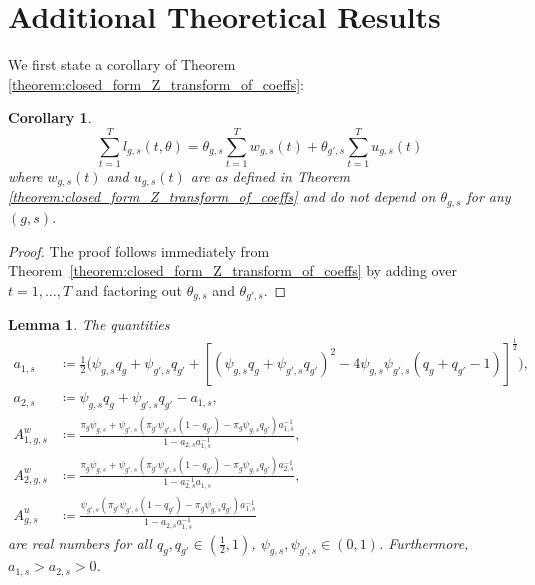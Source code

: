 \documentclass[letterpaper]{article} %
\newtheorem{lemma}{Lemma}
\newtheorem{corollary}{Corollary}
\begin{document}

\section{Additional Theoretical Results}\label{appendix:additional_theoretical_results}

We first state a corollary of Theorem \ref{theorem:closed_form_Z_transform_of_coeffs}:
%
\begin{corollary} \label{cor:total_mass_linear}
\begin{equation*}
    \sum_{t=1}^T l_{g,s}(t,\theta) = \theta_{g,s}\sum_{t=1}^T w_{g,s}(t) + \theta_{g',s}\sum_{t=1}^T u_{g,s}(t)
\end{equation*}
where $w_{g,s}(t)$ and $u_{g,s}(t)$ are as defined in Theorem \ref{theorem:closed_form_Z_transform_of_coeffs}  and do not depend on $\theta_{g,s}$ for any $(g,s)$.
\end{corollary}

\begin{proof}
    The proof follows immediately from Theorem~\ref{theorem:closed_form_Z_transform_of_coeffs} by adding over $t = 1,\dots,T$ and factoring out $\theta_{g,s}$ and $\theta_{g',s}$.
\end{proof}

\begin{lemma} \label{lemma:as_real}
The quantities
\begin{align*}
    a_{1,s} &\coloneqq \frac{1}{2} \big( \psi_{g,s}q_g + \psi_{g',s}q_{g'} + \left[ (\psi_{g,s}q_g + \psi_{g',s}q_{g'})^2 - 4 \psi_{g,s}\psi_{g',s}(q_g + q_{g'} -1) \right]^{\frac{1}{2}} \big), \\
    a_{2,s} &\coloneqq \psi_{g,s}q_g + \psi_{g',s}q_{g'} - a_{1,s},\\
    A^w_{1,g,s} &\coloneqq \frac{ \pi_g \psi_{g,s} + \psi_{g',s}\left( \pi_{g'} \psi_{g',s}(1-q_{g'}) - \pi_g \psi_{g,s} q_{g'}\right)a_{1,s}^{-1}}{1-a_{2,s}a_{1,s}^{-1}}, \\
    A^w_{2,g,s} &\coloneqq \frac{ \pi_g \psi_{g,s} + \psi_{g',s}\left( \pi_{g'} \psi_{g',s}(1-q_{g'}) - \pi_g \psi_{g,s} q_{g'}\right)a_{2,s}^{-1}}{1-a_{2,s}^{-1}a_{1,s}}, \\
    A^u_{g,s} &\coloneqq \frac{ \psi_{g',s}\left( \pi_{g'} \psi_{g',s}(1-q_{g'}) - \pi_g \psi_{g,s} q_{g'}\right)a_{1,s}^{-1}}{1-a_{2,s}a_{1,s}^{-1}}
\end{align*}
are real numbers for all $q_g,q_{g'}\in (\frac{1}{2}, 1)$, $\psi_{g,s}, \psi_{g',s} \in (0,1)$. Furthermore, $a_{1,s} > a_{2,s} > 0$.
\end{lemma}
\end{document}
